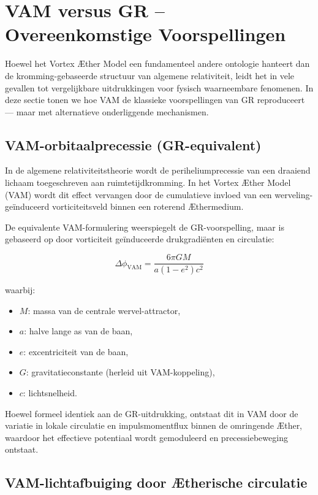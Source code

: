 
\section{VAM versus GR – Overeenkomstige Voorspellingen}

Hoewel het Vortex Æther Model een fundamenteel andere ontologie hanteert dan de kromming-gebaseerde structuur van algemene relativiteit, leidt het in vele gevallen tot vergelijkbare uitdrukkingen voor fysisch waarneembare fenomenen. In deze sectie tonen we hoe VAM de klassieke voorspellingen van GR reproduceert — maar met alternatieve onderliggende mechanismen.


\subsection*{VAM-orbitaalprecessie (GR-equivalent)}


In de algemene relativiteitstheorie wordt de periheliumprecessie van een draaiend lichaam toegeschreven aan ruimtetijdkromming. In het Vortex Æther Model (VAM) wordt dit effect vervangen door de cumulatieve invloed van een werveling-geïnduceerd vorticiteitsveld binnen een roterend Æthermedium.

De equivalente VAM-formulering weerspiegelt de GR-voorspelling, maar is gebaseerd op door vorticiteit geïnduceerde drukgradiënten en circulatie:

\begin{equation}
    \Delta\phi_{\text{VAM}} =
    \frac{6\pi G M}{a(1 - e^2) c^2}
\end{equation}

waarbij:
\begin{itemize}
    \item \( M \): massa van de centrale wervel-attractor,
    \item \( a \): halve lange as van de baan,
    \item \( e \): excentriciteit van de baan,
    \item \( G \): gravitatieconstante (herleid uit VAM-koppeling),
    \item \( c \): lichtsnelheid.
\end{itemize}
Hoewel formeel identiek aan de GR-uitdrukking, ontstaat dit in VAM door de variatie in lokale circulatie en impulsmomentflux binnen de omringende Æther, waardoor het effectieve potentiaal wordt gemoduleerd en precessiebeweging ontstaat.

\subsection*{VAM-lichtafbuiging door Ætherische circulatie}


